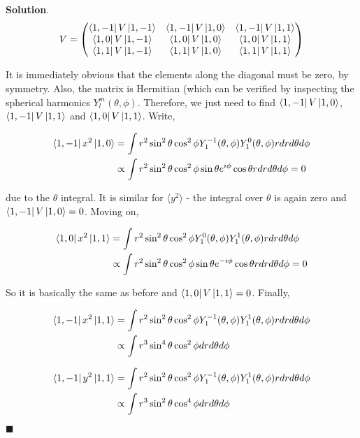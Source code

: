 \documentclass[12pt]{article}
\theoremstyle{definition}
\newenvironment{s}{%
        \begin{trivlist} \item \textbf{Solution}. }{%
            \hspace*{\fill} $\blacksquare$\end{trivlist}}%
\begin{document}
{\begin{s}
\begin{align*}
V &= \begin{pmatrix}
\bra{1,-1}V\ket{1,-1} & \bra{1,-1}V\ket{1,0} & \bra{1,-1}V\ket{1,1}\\
\bra{1,0}V\ket{1,-1} & \bra{1,0}V\ket{1,0} & \bra{1,0}V\ket{1,1}\\
\bra{1,1}V\ket{1,-1} & \bra{1,1}V\ket{1,0}& \bra{1,1}V\ket{1,1}
\end{pmatrix}\\
\end{align*}

It is immediately obvious that the elements along the diagonal must be zero, by symmetry. Also, the matrix is Hermitian (which can be verified by inspecting the spherical harmonics $Y_{l}^{m}(\theta,\phi)$. Therefore, we just need to find $\bra{1,-1}V\ket{1,0}$, $\bra{1,-1}V\ket{1,1}$ and $\bra{1,0}V\ket{1,1}$. Write,

\begin{align*}
\bra{1,-1}x^{2}\ket{1,0} &= \int r^{2}\sin^{2}\theta\cos^{2}\phi Y_{1}^{-1}(\theta,\phi)Y_{1}^{0}(\theta,\phi)rdrd\theta d\phi\\
&\propto \int r^{2}\sin^{2}\theta\cos^{2}\phi \sin\theta e^{i\phi}\cos\theta rdrd\theta d\phi = 0
\end{align*}

due to the $\theta$ integral. It is similar for $\langle y^{2} \rangle$ - the integral over $\theta$ is again zero and $\bra{1,-1}V\ket{1,0} = 0$. Moving on,

\begin{align*}
\bra{1,0}x^{2}\ket{1,1} &= \int r^{2}\sin^{2}\theta\cos^{2}\phi Y_{1}^{0}(\theta,\phi)Y_{1}^{1}(\theta,\phi)rdrd\theta d\phi\\
&\propto \int r^{2}\sin^{2}\theta\cos^{2}\phi \sin\theta e^{-i\phi}\cos\theta rdrd\theta d\phi = 0
\end{align*}

So it is basically the same as before and $\bra{1,0}V\ket{1,1} = 0$. Finally, 

\begin{align*}
\bra{1,-1}x^{2}\ket{1,1} &= \int r^{2}\sin^{2}\theta\cos^{2}\phi Y_{1}^{-1}(\theta,\phi)Y_{1}^{1}(\theta,\phi)rdrd\theta d\phi\\
&\propto \int r^{3}\sin^{4}\theta\cos^{2}\phi drd\theta d\phi
\end{align*}

\begin{align*}
\bra{1,-1}y^{2}\ket{1,1} &= \int r^{2}\sin^{2}\theta\cos^{2}\phi Y_{1}^{-1}(\theta,\phi)Y_{1}^{1}(\theta,\phi)rdrd\theta d\phi\\
&\propto \int r^{3}\sin^{2}\theta\cos^{4}\phi drd\theta d\phi
\end{align*}


\end{s}}
\end{document}
